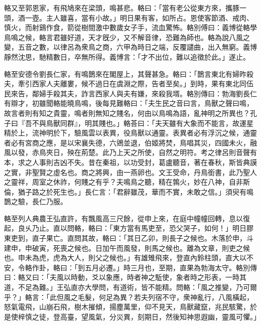 \begin{pinyinscope}
輅又至郭恩家，有飛鳩來在梁頭，鳴甚悲。輅曰：「當有老公從東方來，攜豚一頭，酒一壺。主人雖喜，當有小故。」明日果有客，如所占。恩使客節酒、戒肉、慎火，而射鷄作食，箭從樹間激中數歲女子手，流血驚怖。輅別傅曰：義博從輅學鳥鳴之候，輅言君雖好道，天才旣少，又不解音律，恐難為師也。輅為說八風之變，五音之數，以律呂為衆鳥之商，六甲為時日之端，反覆譴曲，出入無窮。義博靜然沈思，馳精數日，卒無所得。義博言：「才不出位，難以追徵於此。」遂止。

輅至安德令劉長仁家，有鳴鵲來在閣屋上，其聲甚急。輅曰：「鵲言東北有婦昨殺夫，牽引西家人夫離婁，候不過日在虞淵之際，告者至矣。」到時，果有東北同伍民來告，鄰婦手殺其夫，詐言西家人與夫有嫌，來殺我壻。輅別傳曰：勃海劉長仁有辯才，初雖聞輅能曉鳥鳴，後每見難輅曰：「夫生民之音曰言，鳥獸之聲曰鳴，故言者則有知之貴靈，鳴者則無知之賤名，何由以鳥鳴為語，亂神明之所異也？孔子曰『吾不與鳥獸同群』，明其賤也。」輅荅曰：「夫天雖有大象而不能言，故運星精於上，流神明於下，驗風雲以表異，役鳥獸以通靈。表異者必有浮沉之候，通靈者必有宮商之應，是以宋襄失德，六鶂並退，伯姬將焚，鳥唱其災，四國未火，融風以發，赤鳥夾日，殃在荊楚。此乃上天之所使，自然之明符。考之律呂則音聲有本，求之人事則吉凶不失。昔在秦祖，以功受封，葛盧聽音，著在春秋，斯皆典謨之實，非聖賢之虛名也。商之將興，由一燕卵也。文王受命，丹鳥銜書，此乃聖人之靈祥，周室之休祚，何賤之有乎？夫鳴鳥之聽，精在鶉火，妙在八神，自非斯倫，猶子路之於死生也。」長仁言：「君辭雖茂，華而不實，未敢之信。」須臾有鳴鵲之驗，長仁乃服。

輅至列人典農王弘直許，有飄風高三尺餘，從申上來，在庭中幢幢回轉，息以復起，良乆乃止。直以問輅，輅曰：「東方當有馬吏至，恐父哭子，如何！」明日膠東吏到，直子果亡。直問其故，輅曰：「其日乙卯，則長子之候也。木落於申，斗建申，申破寅，死喪之候也。日加午而風發，則馬之候也。離為文章，則吏之候也。申未為虎，虎為大人，則父之候也。」有雄雉飛來，登直內鈴柱頭，直大以不安，令輅作卦，輅曰：「到五月必遷。」時三月也，至期，直果為勃海太守。輅別傳曰：輅又曰：「夫風以時動，爻以象應，時者神之駈使，象者時之形表，一時其道，不足為難。」王弘直亦大學問，有道術，皆不能精。問輅：「風之推變，乃可爾乎？」輅言：「此但風之毛髮，何足為異？若夫列宿不守，衆神亂行，八風橫起，怒氣電飛，山崩石飛，樹木摧傾，揚塵萬里，仰不見天，鳥獸藏竄，兆民駭驚，於是使梓慎之徒，登高臺，望風氣，分災異，刻期日，然後知神思遐幽，靈風可懼。」


\end{pinyinscope}
